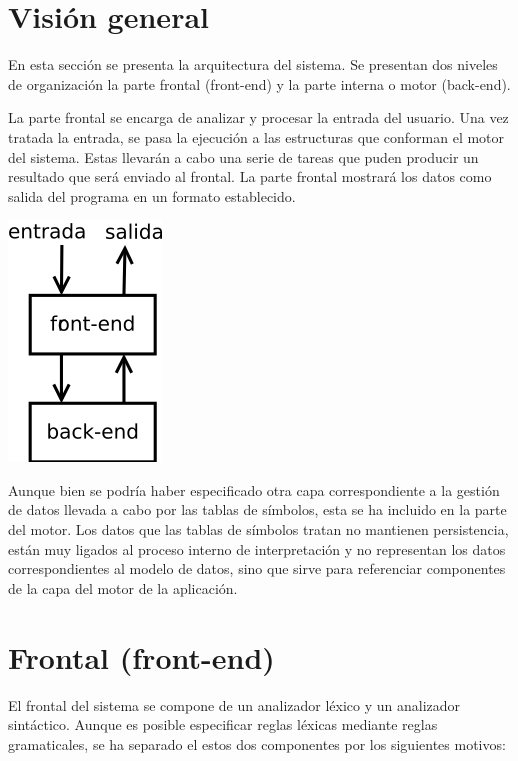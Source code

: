 \section {Visión general}
En esta sección se presenta la arquitectura del sistema. Se presentan 
dos niveles de organización la parte frontal (front-end) y la parte 
interna o motor (back-end). 

La parte frontal se encarga de analizar y procesar la entrada del usuario.
Una vez tratada la entrada, se pasa la ejecución a las estructuras que conforman 
el motor del sistema. Estas llevarán a cabo una serie de tareas que puden producir
un resultado que será enviado al frontal. La parte frontal mostrará 
los datos como salida del programa en un formato establecido.

\begin{center}
\includegraphics[scale=0.7]{dia/generic.png} \\
\end{center}

Aunque bien se podría haber especificado otra capa correspondiente a la gestión de datos
llevada a cabo por las tablas de símbolos, esta se ha incluido en la parte del motor. Los datos que 
las tablas de símbolos tratan no mantienen persistencia, están muy ligados al proceso interno de 
interpretación y no representan los datos correspondientes al modelo de datos, sino que sirve para
referenciar componentes de la capa del motor de la aplicación.

\section{Frontal (front-end)}
El frontal del sistema se compone de un analizador léxico y un analizador sintáctico. 
Aunque es posible especificar reglas léxicas mediante reglas gramaticales, se ha separado el 
estos dos componentes por los siguientes motivos:

